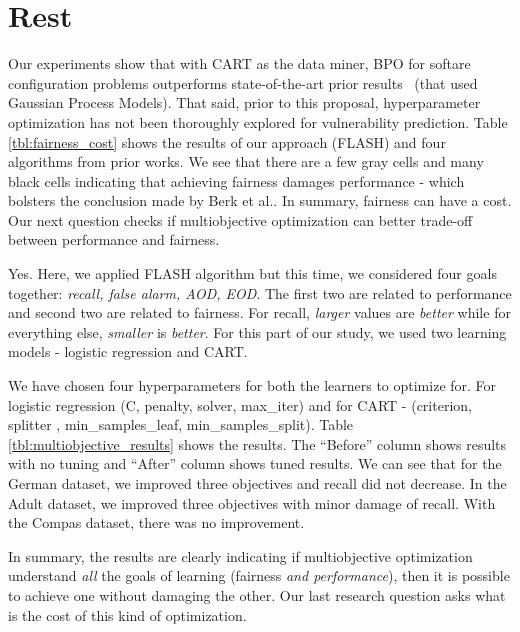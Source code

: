 
\section{Rest}
Our experiments show that with  CART as the data miner,
BPO for softare configuration problems outperforms  state-of-the-art 
prior results~\cite{zuluaga2016varepsilon} (that used
Gaussian Process Models). 
That said,
prior to this proposal, hyperparameter optimization has not been thoroughly explored
for  vulnerability prediction. 
Table \ref{tbl:fairness_cost} shows the results of our approach (FLASH) and four algorithms from prior works. We see that there are a few gray cells and many black cells indicating that achieving fairness damages performance - which bolsters the conclusion made by Berk et al.\cite{berk2017convex}. In summary,  fairness can have a cost. Our next question checks if multiobjective optimization can better trade-off between performance and fairness.  


Yes. Here, we applied  FLASH algorithm but this time, we considered four goals together: \textit{recall, false alarm, AOD, EOD}. The first two are related to performance and second two are related to fairness. For
recall, {\em larger} values are {\em better} while for everything
else, {\em smaller} is {\em better}.
 For this part of our study, we used two learning models - logistic regression and CART. 
 
 We have chosen four hyperparameters for both the learners to optimize for. For logistic regression (C, penalty, solver, max\_iter) and for CART - (criterion, splitter , min\_samples\_leaf, min\_samples\_split). Table \ref{tbl:multiobjective_results} shows the results. The ``Before'' column shows results with no tuning and ``After'' column shows tuned results. We can see that for
 the German dataset, we improved three objectives and recall did not decrease. In the Adult dataset, we improved three objectives with minor damage of recall. 
 With the
 Compas dataset, there was no improvement. 
 
 In summary, the results are clearly indicating if  multiobjective  optimization understand {\em all} the goals of learning
 (fairness {\em and performance}), then it is possible to achieve one without
 damaging the other. Our last research question asks  what is the cost of this kind of optimization.

